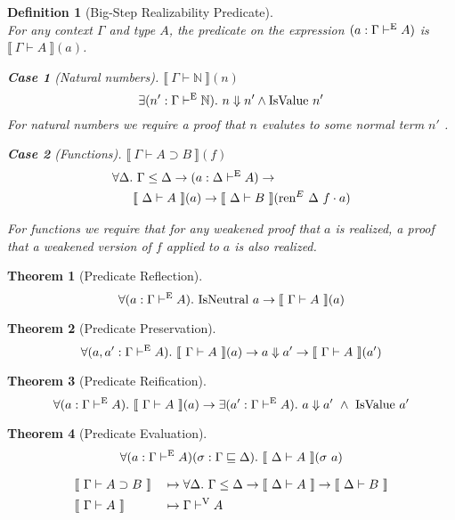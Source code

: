 \documentclass[preprint,nonatbib]{sigplanconf}
\newtheorem{mydfn}{Definition}
\newtheorem{mysubdfn}{Case}
\numberwithin{mysubdfn}{mydfn}
\newtheorem{mythm}{Theorem}
\def\dfn{\mapsto}
\def\bigstep{\Downarrow}
\def\arr{\supset}
\def\marr{\rightarrow}
\def\app{\cdot}
\def\nat{\mathbb{N}}
\newcommand{\turn}[1]{\vdash^\con{#1}}
\newcommand{\el}[1]{\llbracket ~ #1 ~ \rrbracket}
\newcommand{\con}[1]{\textmd{#1}}
\newcommand{\fun}[1]{\textmd{#1}}
\newcommand{\typm}[1]{\el{\Gamma \vdash #1}}
\newcommand{\dtypm}[1]{\el{\Delta \vdash #1}}
\newcommand{\type}[1]{\Gamma \turn{E} #1}
\newcommand{\dtype}[1]{\Delta \turn{E} #1}
\newcommand{\typv}[1]{\Gamma \turn{V} #1}
\newcommand{\ren}[1]{\Gamma \le #1}
\def\dren{\ren{\Delta}}
\newcommand{\env}[1]{\Gamma \sqsubseteq #1}
\def\denv{\env{\Delta}}
\begin{document}
\begin{mydfn}[Big-Step Realizability Predicate]
$ $\\
For any context $\Gamma$ and type $A$, the predicate on the expression
$(a : \type{A})$ is $\typm{A}(a)$.

\begin{mysubdfn}[Natural numbers]
$\typm{\nat}(n)$
$$
\exists (n' : \type{\nat}).~ n \bigstep n' \wedge \fun{IsValue} ~ n'
$$
For natural numbers we require a proof that $n$ evalutes to
some normal term $n'$ .
\end{mysubdfn}


\begin{mysubdfn}[Functions]
$\typm{A \arr B}(f)$
\begin{align*}
\forall \Delta.&~ \dren \marr (a : \dtype{A}) \marr \\
&\dtypm{A}(a) \marr \dtypm{B}(\fun{ren}^E ~ \Delta ~ f \app a)
\end{align*}



For functions we require that for any weakened proof that $a$
is realized, a proof that a weakened version of $f$ applied to
$a$ is also realized.
\end{mysubdfn}

\end{mydfn}

\begin{mythm}[Predicate Reflection]
$$\forall (a : \type{A}).~ \fun{IsNeutral} ~ a \marr \typm{A}(a)$$
\end{mythm}

\begin{mythm}[Predicate Preservation]
$$
\forall (a, a' : \type{A}).~ \typm{A}(a) \marr 
a \bigstep a' \marr \typm{A}(a')
$$
\end{mythm}

\begin{mythm}[Predicate Reification]
$$
\forall (a : \type{A}).~ \typm{A}(a) \marr
\exists (a' : \type{A}).~ a \bigstep a' ~ \wedge ~ \fun{IsValue} ~ a'
$$
\end{mythm}

\begin{mythm}[Predicate Evaluation]
$$
\forall (a : \type{A}) (\sigma : \denv).~ \dtypm{A}(\sigma ~ a)
$$
\end{mythm}




\begin{align*}
&\typm{A \arr B}& &\dfn \forall \Delta.~ \dren \marr \dtypm{A} \marr \dtypm{B} \\
&\typm{A}& &\dfn \typv{A}
\end{align*}
\end{document}
